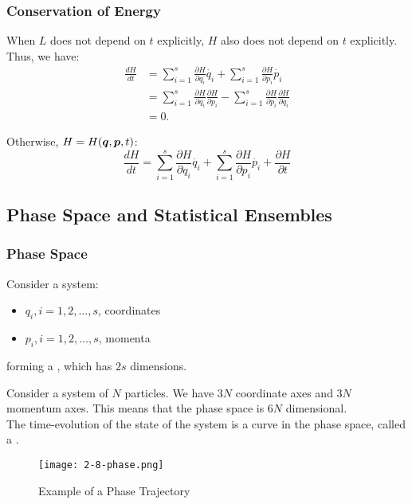 \documentclass[../main/main.tex]{subfiles}
\begin{document}
\subsubsection{Conservation of Energy}
When $L$ does not depend on $t$ explicitly, $H$ also does not depend on $t$ explicitly. Thus, we have:
\begin{align*}
	\frac{dH}{dt} & = \sum\limits_{i=1}^{s} \frac{\partial H}{\partial q_i} \dot{q_i} + \sum\limits_{i=1}^{s} \frac{\partial H}{\partial p_i} \dot{p_i}                                           \\
	              & = \sum\limits_{i=1}^{s} \frac{\partial H}{\partial q_i}\frac{\partial H}{\partial p_i} - \sum\limits_{i=1}^{s} \frac{\partial H}{\partial p_i}\frac{\partial H}{\partial q_i} \\
	              & = 0.
\end{align*}

Otherwise, $H = H(\bm{q},\bm{p},t)$: \[
	\frac{dH}{dt} = \sum\limits_{i=1}^{s} \frac{\partial H}{\partial q_i}\dot{q_i} + \sum\limits_{i=1}^{s} \frac{\partial H}{\partial p_i} \dot{p_i} + \frac{\partial H}{\partial t}
\]

\subsection{Phase Space and Statistical Ensembles}

\subsubsection*{Phase Space}
Consider a system:
\begin{itemize}
	\item $q_i, i=1, 2, \ldots, s$, coordinates
	\item $p_i, i=1, 2, \ldots, s$, momenta
\end{itemize}
forming a , which has $2s$ dimensions.

\begin{example}
	Consider a system of $N$ particles. We have $3N$ coordinate axes and $3N$ momentum axes. This means that the phase space is $6N$ dimensional. \\

	The time-evolution of the state of the system is a curve in the phase space, called a .
\end{example}

\begin{figure}[htpb]
	\centering
	\texttt{[image: 2-8-phase.png]}
	\caption{Example of a Phase Trajectory}
	\label{fig:2-8-phase}
\end{figure}
\end{document}
